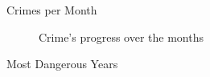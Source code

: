 \documentclass[12pt]{beamer}
\begin{document}
        \begin{frame}{Crimes per Month}
            \begin{figure}
                \centering
                \caption{Crime's progress over the months}
            \end{figure}
        \end{frame}

        \begin{frame}{Most Dangerous Years}
            \begin{figure}
                \centering
            \end{figure}
        \end{frame}
\end{document}
